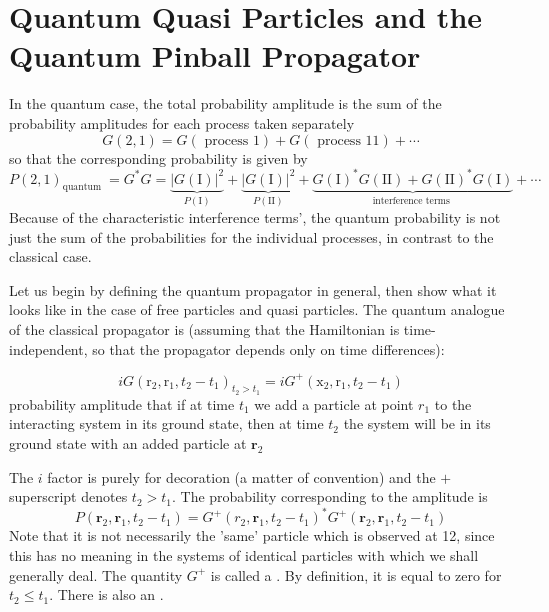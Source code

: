 \section{Quantum Quasi Particles and the Quantum Pinball Propagator}
In the quantum case, the total probability amplitude is the sum of the probability amplitudes for each process taken separately
$$G(2,1)=G(\text { process } 1)+G(\text { process } 11)+\cdots$$
so that the corresponding probability is given by
$$P(2,1)_{\text {quantum }}=G^{*} G=\underbrace{|G(\mathrm{I})|^{2}}_{P(\mathrm{I})}+\underbrace{|G(\mathrm{I})|^{2}}_{P(\mathrm{II})}+\underbrace{G(\mathrm{I})^{*} G(\mathrm{II})+G(\mathrm{II})^{*} G(\mathrm{I})}_{\text {interference terms }}+\cdots$$
Because of the characteristic interference terms', the quantum probability is not just the sum of the probabilities for the individual processes, in contrast to the classical case.

Let us begin by defining the quantum propagator in general, then show
what it looks like in the case of free particles and quasi particles. The quantum analogue of the classical propagator is (assuming that the Hamiltonian is time-independent, so that the propagator depends only on time differences):
\begin{imp}
\begin{equation}i G\left(\mathrm{r}_{2}, \mathrm{r}_{1}, t_{2}-t_{1}\right)_{t_{2}>t_{1}}=i G^{+}\left(\mathrm{x}_{2}, \mathrm{r}_{1}, t_{2}-t_{1}\right)\end{equation}
probability amplitude that if at time $t_{1}$ we add a particle at point $r_{1}$ to the interacting system in its ground state, then at time $t_{2}$ the system will be in its ground state with an added particle at $\mathbf{r}_{2}$
\end{imp}
The $i$ factor is purely for decoration (a matter of convention) and the $+$ superscript denotes $t_{2}>t_{1} .$ The probability corresponding to the amplitude is
$$P\left(\mathbf{r}_{2}, \mathbf{r}_{1}, t_{2}-t_{1}\right)=G^{+}\left(r_{2}, \mathbf{r}_{1}, t_{2}-t_{1}\right)^{*} G^{+}\left(\mathbf{r}_{2}, \mathbf{r}_{1}, t_{2}-t_{1}\right)$$
Note that it is not necessarily the 'same' particle which is observed at 12, since
this has no meaning in the systems of identical particles with which we shall generally deal. The quantity $G^{+}$ is called a . By definition, it is equal to zero for $t_{2} \leqslant t_{1} .$ There is also an .


